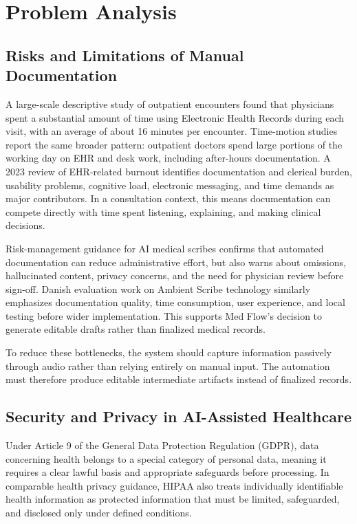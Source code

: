 \section{Problem Analysis}
\label{sec:problem-analysis}

\subsection{Risks and Limitations of Manual Documentation}
\label{subsec:manual-documentation-risks}

A large-scale descriptive study of outpatient encounters found that physicians spent a substantial amount of time using Electronic Health Records during each visit, with an average of about 16 minutes per encounter. Time-motion studies report the same broader pattern: outpatient doctors spend large portions of the working day on EHR and desk work, including after-hours documentation. A 2023 review of EHR-related burnout identifies documentation and clerical burden, usability problems, cognitive load, electronic messaging, and time demands as major contributors. In a consultation context, this means documentation can compete directly with time spent listening, explaining, and making clinical decisions.

Risk-management guidance for AI medical scribes confirms that automated documentation can reduce administrative effort, but also warns about omissions, hallucinated content, privacy concerns, and the need for physician review before sign-off. Danish evaluation work on Ambient Scribe technology similarly emphasizes documentation quality, time consumption, user experience, and local testing before wider implementation. This supports Med Flow's decision to generate editable drafts rather than finalized medical records.

To reduce these bottlenecks, the system should capture information passively through audio rather than relying entirely on manual input. The automation must therefore produce editable intermediate artifacts instead of finalized records.

\subsection{Security and Privacy in AI-Assisted Healthcare}
\label{subsec:ai-healthcare-security-privacy}

Under Article 9 of the General Data Protection Regulation (GDPR), data concerning health belongs to a special category of personal data, meaning it requires a clear lawful basis and appropriate safeguards before processing. In comparable health privacy guidance, HIPAA also treats individually identifiable health information as protected information that must be limited, safeguarded, and disclosed only under defined conditions.

